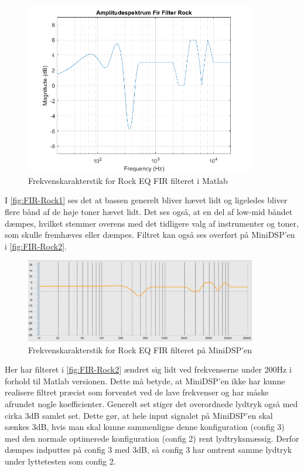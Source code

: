 \begin{figure}[H]
	\center
	\includegraphics[width=0.9\textwidth]{figur/FIR-Rock1}
	\caption{Frekvenskarakterstik for Rock EQ FIR filteret i Matlab}
	\label{fig:FIR-Rock1}
\end{figure}
I \autoref{fig:FIR-Rock1} ses det at bassen generelt bliver hævet lidt og ligeledes bliver flere bånd af de høje toner hævet lidt. Det ses også, at en del af low-mid båndet dæmpes, hvilket stemmer overens med det tidligere valg af instrumenter og toner, som skulle fremhæves eller dæmpes. Filtret kan også ses overført på MiniDSP'en i \autoref{fig:FIR-Rock2}.

\begin{figure}[H]
	\center
	\includegraphics[width=0.9\textwidth]{figur/FIR-Rock2}
	\caption{Frekvenskarakterstik for Rock EQ FIR filteret på MiniDSP'en}
	\label{fig:FIR-Rock2}
\end{figure}
 Her har filteret i \autoref{fig:FIR-Rock2} ændret sig lidt ved frekvenserne under 200Hz i forhold til Matlab versionen. Dette må betyde, at MiniDSP'en ikke har kunne realisere filtret præcist som forventet ved de lave frekvenser og har måske afrundet nogle koefficienter. Generelt set stiger det overordnede lydtryk også med cirka 3dB samlet set. Dette gør, at hele input signalet på MiniDSP'en skal sænkes 3dB, hvis man skal kunne sammenligne denne konfiguration (config 3) med den normale optimerede konfiguration (config 2) rent lydtryksmæssig. Derfor dæmpes indputtes på config 3 med 3dB, så config 3 har omtrent samme lydtryk under lyttetesten som config 2.  

